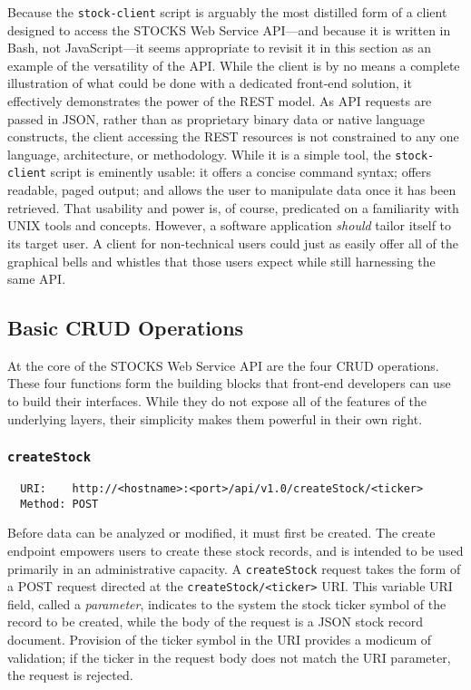 \documentclass[
11pt,
titlepage,
]{article}
\begin{document}
Because the \texttt{stock-client} script is arguably the most distilled form of
a client designed to access the STOCKS Web Service API---and because it is
written in Bash, not JavaScript---it seems appropriate to revisit it in this
section as an example of the versatility of the API. While the client is by no
means a complete illustration of what could be done with a dedicated front-end
solution, it effectively demonstrates the power of the REST model. As API
requests are passed in JSON, rather than as proprietary binary data or native
language constructs, the client accessing the REST resources is not constrained
to any one language, architecture, or methodology. While it is a simple tool,
the \texttt{stock-client} script is eminently usable: it offers a concise
command syntax; offers readable, paged output; and allows the user to manipulate
data once it has been retrieved. That usability and power is, of course,
predicated on a familiarity with UNIX tools and concepts. However, a software
application \textit{should} tailor itself to its target user. A client for
non-technical users could just as easily offer all of the graphical bells and
whistles that those users expect while still harnessing the same API.

\subsection{Basic CRUD Operations}

At the core of the STOCKS Web Service API are the four CRUD operations. These
four functions form the building blocks that front-end developers can use to
build their interfaces. While they do not expose all of the features of the
underlying layers, their simplicity makes them powerful in their own right.

\subsubsection{\texttt{createStock}}

\begin{lstlisting}
  URI:    http://<hostname>:<port>/api/v1.0/createStock/<ticker>
  Method: POST
\end{lstlisting}

Before data can be analyzed or modified, it must first be created. The create
endpoint empowers users to create these stock records, and is intended to be
used primarily in an administrative capacity. A \texttt{createStock} request
takes the form of a POST request directed at the \texttt{createStock/<ticker>}
URI. This variable URI field, called a \textit{parameter}, indicates to the
system the stock ticker symbol of the record to be created, while the body of
the request is a JSON stock record document. Provision of the ticker symbol in
the URI provides a modicum of validation; if the ticker in the request body does
not match the URI parameter, the request is rejected.
\end{document}
